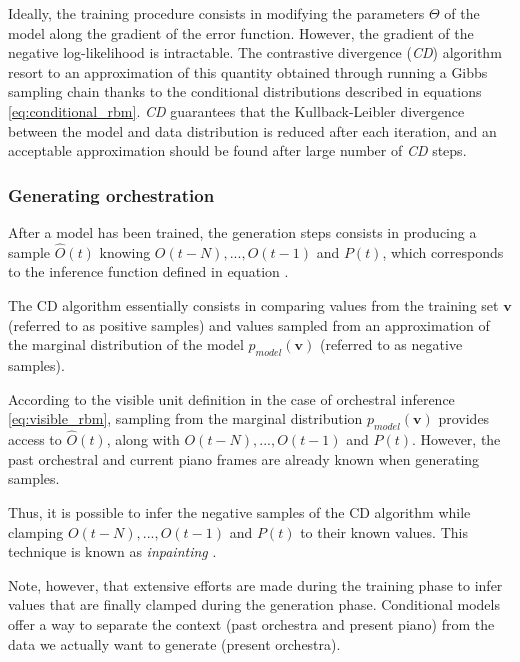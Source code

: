 \documentclass{article}
\begin{document}
Ideally, the training procedure consists in modifying the parameters $\Theta$ of the model along the gradient of the error function.
However, the gradient of the negative log-likelihood is intractable.
The contrastive divergence (\textit{CD}) algorithm \cite{fischer2012introduction,hinton2010practical} resort to an approximation of this quantity obtained through running a Gibbs sampling chain thanks to the conditional distributions described in equations \ref{eq:conditional_rbm}.
\textit{CD} guarantees that the Kullback-Leibler divergence between the model and data distribution is reduced after each iteration\cite{hinton2002training}, and an acceptable approximation should be found after large number of \textit{CD} steps.

\subsubsection{Generating orchestration}
After a model has been trained, the generation steps consists in producing a sample $\hat{O}(t)$ knowing $O(t-N),...,O(t-1)$ and $P(t)$, which corresponds to the inference function defined in equation .

The CD algorithm essentially consists in comparing values from the training set $\bm{v}$ (referred to as positive samples) and  values sampled from an approximation of the marginal distribution of the model $p_{model}(\bm{v})$ (referred to as negative samples).

According to the visible unit definition in the case of orchestral inference \ref{eq:visible_rbm}, sampling from the marginal distribution $p_{model}(\bm{v})$ provides access to $\hat{O}(t)$, along with $O(t-N),...,O(t-1)$ and $P(t)$.
However, the past orchestral and current piano frames are already known when generating samples.

Thus, it is possible to infer the negative samples of the CD algorithm while clamping $O(t-N), ..., O(t-1)$ and $P(t)$ to their known values. This technique is known as \textit{inpainting} \cite{Fischer2012}.

Note, however, that extensive efforts are made during the training phase to infer values that are finally clamped during the generation phase. Conditional models offer a way to separate the context (past orchestra and present piano) from the data we actually want to generate (present orchestra).
\end{document}
